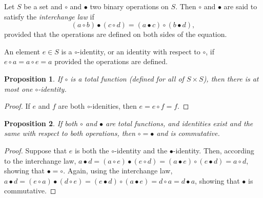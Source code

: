 \documentclass[12pt]{article}
\newtheorem{prop}{Proposition}
\begin{document}
Let $S$ be a set and $\circ$ and $\bullet$ two  binary operations on $S$.  Then $\circ$ and $\bullet$ are said to satisfy the \emph{interchange law} if
$$(a\circ b)\bullet (c\circ d)=(a\bullet c)\circ (b\bullet d),$$
provided that the operations are defined on both sides of the equation.

An element $e\in S$ is a $\circ$-identity, or an identity with respect to $\circ$, if $e\circ a=a\circ e=a$ provided the operations are defined.

\begin{prop} If $\circ$ is a total function (defined for all of $S\times S$), then there is at most one $\circ$-identity. \end{prop}
\begin{proof}  If $e$ and $f$ are both $\circ$-idenities, then $e=e\circ f=f$.
\end{proof}

\begin{prop}  If both $\circ$ and $\bullet$ are total functions, and identities exist and the same with respect to both operations, then $\circ=\bullet$ and is commutative.\end{prop}
\begin{proof}  Suppose that $e$ is both the $\circ$-identity and the $\bullet$-identity.  Then, according to the interchange law, $a\bullet d = (a\circ e)\bullet (e\circ d)=(a\bullet e)\circ (e\bullet d) = a \circ d$, showing that $\bullet = \circ$.  Again, using the interchange law, $a\bullet d=(e\circ a)\bullet (d\circ e)= (e\bullet d)\circ (a\bullet e) = d\circ a = d\bullet a$, showing that $\bullet$ is commutative.
\end{proof}
\end{document}
